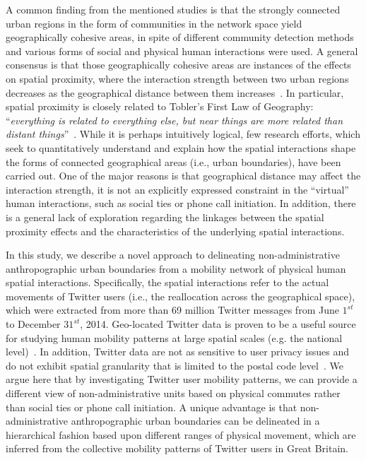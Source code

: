 \documentclass[]{tGIS2e}
\begin{document}
A common finding from the mentioned studies is that the strongly connected urban regions in the form of communities in the network space yield geographically cohesive areas, in spite of different community detection methods and various forms of social and physical human interactions were used.
A general consensus is that those geographically cohesive areas are instances of the effects on spatial proximity, where the interaction strength between two urban regions decreases as the geographical distance between them increases~\citep{fotheringham1981}.
In particular, spatial proximity is closely related to Tobler's First Law of Geography: ``\textit{everything is related to everything else, but near things are more related than distant things}''~\citep{miller2004}.
While it is perhaps intuitively logical, few research efforts, which seek to quantitatively understand and explain how the spatial interactions shape the forms of connected geographical areas (i.e., urban boundaries), have been carried out. 
One of the major reasons is that geographical distance may affect the interaction strength, it is not an explicitly expressed constraint in the ``virtual'' human interactions, such as social ties or phone call initiation.
In addition, there is a general lack of exploration regarding the linkages between the spatial proximity effects and the characteristics of the underlying spatial interactions. 

In this study, we describe a novel approach to delineating non-administrative anthropographic urban boundaries from a mobility network of physical human spatial interactions.
Specifically, the spatial interactions refer to the actual movements of Twitter users (i.e., the reallocation across the geographical space), which were extracted from more than 69 million Twitter messages from June $1^{st}$ to December $31^{st}$, 2014.
Geo-located Twitter data is proven to be a useful source for studying human mobility patterns at large spatial scales (e.g. the national level)~\citep{hawelka,jurdak2015}.
In addition, Twitter data are not as sensitive to user privacy issues and do not exhibit spatial granularity that is limited to the postal code level~\citep{thiemann}. 
We argue here that by investigating Twitter user mobility patterns, we can provide a different view of non-administrative units based on physical commutes rather than social ties or phone call initiation. 
A unique advantage is that non-administrative anthropographic urban boundaries can be delineated in a hierarchical fashion based upon different ranges of physical movement, which are inferred from the collective mobility patterns of Twitter users in Great Britain. 
\end{document}
